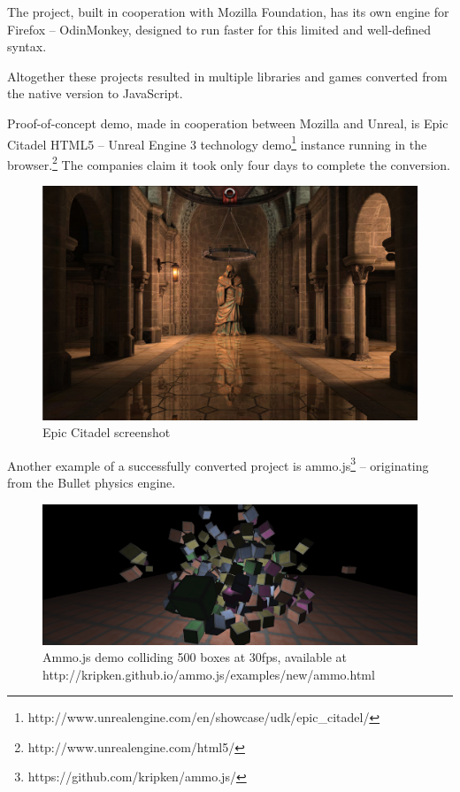 

The project, built in cooperation with Mozilla Foundation, has its own engine for Firefox -- OdinMonkey, designed to run faster for this limited and well-defined syntax.

Altogether these projects resulted in multiple libraries and games converted from the native version to JavaScript.

Proof-of-concept demo, made in cooperation between Mozilla and Unreal, is Epic Citadel HTML5 -- Unreal Engine 3 technology demo\footnote{http://www.unrealengine.com/en/showcase/udk/epic\_citadel/}  instance running in the browser.\footnote{http://www.unrealengine.com/html5/} The companies claim it took only four days to complete the conversion.

\begin{figure}[h!]
  \caption{Epic Citadel screenshot}
  \label{img:epicitadel}
  \centering
	\includegraphics[width=16cm]{emscripten/epic-citadel.jpg}
\end{figure}

Another example of a successfully converted project is ammo.js\footnote{https://github.com/kripken/ammo.js/} -- originating from the Bullet physics engine.

\begin{figure}[h!]
  \caption{Ammo.js demo colliding 500 boxes at 30fps, available at http://kripken.github.io/ammo.js/examples/new/ammo.html}
  \label{img:epicitadel}
  \centering
	\includegraphics[width=16cm]{emscripten/ammojs.png}
\end{figure}


